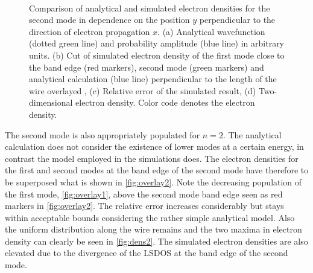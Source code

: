 \begin{figure}[h]
  \begin{center}
 \qquad
    \\
    \qquad
    \caption{Comparison of analytical and simulated electron densities for the second mode in dependence on the position $y$ perpendicular to the direction of electron propagation $x$. (a) Analytical wavefunction (dotted green line) and probability amplitude (blue line) in arbitrary units. (b) Cut of simulated electron density of the first mode close to the band edge (red markers), second mode (green markers) and analytical calculation (blue line) perpendicular to the length of the wire overlayed , (c) Relative error of the simulated result, (d) Two-dimensional electron density. Color code denotes the electron density.}\label{fig:mode2}
  \end{center}
\end{figure}
The second mode is also appropriately populated for $n=2$. The analytical calculation does not consider the existence of lower modes at a certain energy, in contrast the model employed in the simulations does. The electron densities for the first and second modes at the band edge of the second mode have therefore to be superposed what is shown in \cref{fig:overlay2}. Note the decreasing population of the first mode, \cref{fig:overlay1}, above the second mode band edge seen as red markers in \cref{fig:overlay2}. The relative error increases considerably but stays within acceptable bounds considering the rather simple analytical model.
Also the uniform distribution along the wire remains and the two maxima in electron density can clearly be seen in \cref{fig:dens2}. The simulated electron densities are also elevated due to the divergence of the LSDOS at the band edge of the second mode.\par

